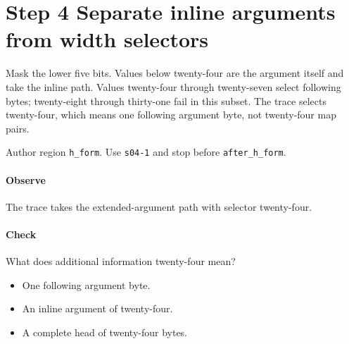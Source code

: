 \section{Step 4 Separate inline arguments from width selectors}\label{cbor-s04}
Mask the lower five bits. Values below twenty-four are the argument itself and take the inline path. Values twenty-four through twenty-seven select following bytes; twenty-eight through thirty-one fail in this subset. The trace selects twenty-four, which means one following argument byte, not twenty-four map pairs.

Author region \texttt{h\_form}. Use \texttt{s04-1} and stop before \texttt{after\_h\_form}. 

\paragraph{Observe} The trace takes the extended-argument path with selector twenty-four.

\paragraph{Check} What does additional information twenty-four mean?
\begin{itemize}
\item[A.] One following argument byte.
\item[B.] An inline argument of twenty-four.
\item[C.] A complete head of twenty-four bytes.
\end{itemize}

